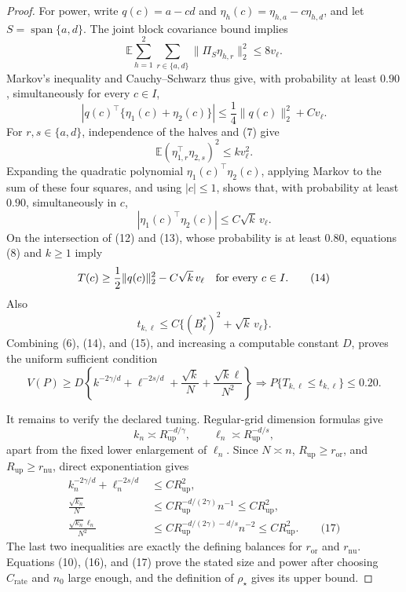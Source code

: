 \documentclass{article}
\begin{document}
\begin{proof}
For power, write \(q(c)=a-cd\) and \(\eta_h(c)=\eta_{h,a}-c\eta_{h,d}\), and let \(S=\operatorname{span}\{a,d\}\).  The joint block covariance bound implies
\[
 \mathbb E\sum_{h=1}^2\sum_{r\in\{a,d\}}
 \|\Pi_S\eta_{h,r}\|_2^2\le8v_\ell. \tag{11}
\]
Markov's inequality and Cauchy--Schwarz thus give, with probability at least \(0.90\), simultaneously for every \(c\in I\),
\[
 |q(c)^\top\{\eta_1(c)+\eta_2(c)\}|
 \le\frac14\|q(c)\|_2^2+C v_\ell. \tag{12}
\]
For \(r,s\in\{a,d\}\), independence of the halves and (7) give
\[
 \mathbb E(\eta_{1,r}^\top\eta_{2,s})^2\le k v_\ell^2.
\]
Expanding the quadratic polynomial \(\eta_1(c)^\top\eta_2(c)\), applying Markov to the sum of these four squares, and using \(|c|\le1\), shows that, with probability at least \(0.90\), simultaneously in \(c\),
\[
 |\eta_1(c)^\top\eta_2(c)|\le C\sqrt{k}\,v_\ell. \tag{13}
\]
On the intersection of (12) and (13), whose probability is at least \(0.80\), equations (8) and \(k\ge1\) imply
\[
 T(c)\ge\frac12\|q(c)\|_2^2-C\sqrt{k}\,v_\ell
 \quad\hbox{for every }c\in I. \tag{14}
\]
Also
\[
 t_{k,\ell}\le C\{(B_\ell^*)^2+\sqrt{k}\,v_\ell\}. \tag{15}
\]
Combining (6), (14), and (15), and increasing a computable constant \(D\), proves the uniform sufficient condition
\[
 V(P)\ge D\left\{k^{-2\gamma/d}+\ell^{-2s/d}
                 +\frac{\sqrt{k}}N+\frac{\sqrt{k}\ell}{N^2}\right\}
 \Longrightarrow P\{T_{k,\ell}\le t_{k,\ell}\}\le0.20. \tag{16}
\]

It remains to verify the declared tuning.  Regular-grid dimension formulas give
\[
 k_n\asymp R_{\mathrm{up}}^{-d/\gamma},
 \qquad \ell_n\asymp R_{\mathrm{up}}^{-d/s},
\]
apart from the fixed lower enlargement of \(\ell_n\).  Since \(N\asymp n\), \(R_{\mathrm{up}}\ge r_{\mathrm{or}}\), and \(R_{\mathrm{up}}\ge r_{\mathrm{nu}}\), direct exponentiation gives
\[
\begin{aligned}
 k_n^{-2\gamma/d}+\ell_n^{-2s/d}&\le C R_{\mathrm{up}}^2,\\
 \frac{\sqrt{k_n}}N
 &\le C R_{\mathrm{up}}^{-d/(2\gamma)}n^{-1}
 \le C R_{\mathrm{up}}^2,\\
 \frac{\sqrt{k_n}\ell_n}{N^2}
 &\le C R_{\mathrm{up}}^{-d/(2\gamma)-d/s}n^{-2}
 \le C R_{\mathrm{up}}^2. \qquad\text{(17)}
\end{aligned}
\]
The last two inequalities are exactly the defining balances for \(r_{\mathrm{or}}\) and \(r_{\mathrm{nu}}\).  Equations (10), (16), and (17) prove the stated size and power after choosing \(C_{\mathrm{rate}}\) and \(n_0\) large enough, and the definition of \(\rho_\star\) gives its upper bound.


\end{proof}
\end{document}
